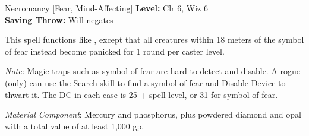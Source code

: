 {Necromancy [Fear, Mind-Affecting]}
{
	\textbf{Level:}
	Clr 6, Wiz 6\\
	\textbf{Saving Throw:}
	Will negates\\
}
{
	This spell functions like , except that all creatures within 18 meters of the symbol of fear instead become panicked for 1 round per caster level.

	\textit{Note:} Magic traps such as symbol of fear are hard to detect and disable. A rogue (only) can use the Search skill to find a symbol of fear and Disable Device to thwart it. The DC in each case is 25 + spell level, or 31 for symbol of fear.

	\textit{Material Component}:
	Mercury and phosphorus, plus powdered diamond and opal with a total value of at least 1,000 gp.

}
